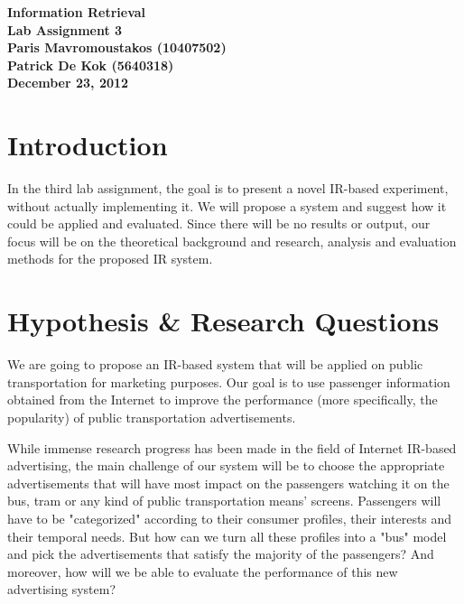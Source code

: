 \documentclass[letterpaper,11pt]{article}
\begin{document}
\begin{center}
\Huge \textbf{Information Retrieval}\\ \vspace{0.4cm}
\huge \textbf{Lab Assignment 3}\\ \vspace{0.4cm}
\LARGE \textbf{Paris Mavromoustakos (10407502)}\\
\LARGE \textbf{Patrick De Kok (5640318)}\\ \vspace{0.4cm}
\textbf{ December 23, 2012}
\end{center}


\section{Introduction}
In the third lab assignment, the goal is to present a novel IR-based experiment, without actually implementing it. We will propose a system and suggest how it could be applied and evaluated. Since there will be no results or output, our focus will be on the theoretical background and research, analysis and evaluation methods for the proposed IR system.



\section{Hypothesis \& Research Questions}

We are going to propose an IR-based system that will be applied on public transportation for marketing purposes. Our goal is to use passenger information obtained from the Internet to improve the performance (more specifically, the popularity) of public transportation advertisements. 

While immense research progress has been made in the field of Internet IR-based advertising, the main challenge of our system will be to choose the appropriate advertisements that will have most impact on the passengers watching it on the bus, tram or any kind of public transportation means' screens. Passengers will have to be "categorized" according to their consumer profiles, their interests and their temporal needs. But how can we turn all these profiles into a "bus" model and pick the advertisements that satisfy the majority of the passengers? And moreover, how will we be able to evaluate the performance of this new advertising system? 
\end{document}
